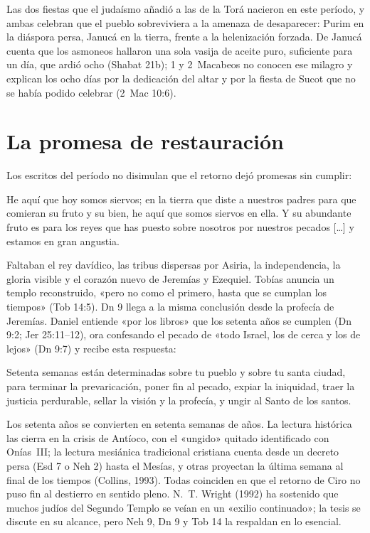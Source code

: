 Las dos fiestas que el judaísmo añadió a las de la Torá nacieron en este período, y ambas celebran que el pueblo sobreviviera a la amenaza de desaparecer: Purim en la diáspora persa, Janucá en la tierra, frente a la helenización forzada. De Janucá cuenta que los asmoneos hallaron una sola vasija de aceite puro, suficiente para un día, que ardió ocho (Shabat 21b); 1 y 2~Macabeos no conocen ese milagro y explican los ocho días por la dedicación del altar y por la fiesta de Sucot que no se había podido celebrar (2~Mac 10:6).

\section{La promesa de restauración}

Los escritos del período no disimulan que el retorno dejó promesas sin cumplir:
\begin{cita}He aquí que hoy somos siervos; en la tierra que diste a nuestros padres para que comieran su fruto y su bien, he aquí que somos siervos en ella. Y su abundante fruto es para los reyes que has puesto sobre nosotros por nuestros pecados [\ldots] y estamos en gran angustia.\end{cita}
Faltaban el rey davídico, las tribus dispersas por Asiria, la independencia, la gloria visible y el corazón nuevo de Jeremías y Ezequiel. Tobías anuncia un templo reconstruido, «pero no como el primero, hasta que se cumplan los tiempos» (Tob 14:5). Dn 9 llega a la misma conclusión desde la profecía de Jeremías. Daniel entiende «por los libros» que los setenta años se cumplen (Dn 9:2; Jer 25:11--12), ora confesando el pecado de «todo Israel, los de cerca y los de lejos» (Dn 9:7) y recibe esta respuesta:
\begin{cita}Setenta semanas están determinadas sobre tu pueblo y sobre tu santa ciudad, para terminar la prevaricación, poner fin al pecado, expiar la iniquidad, traer la justicia perdurable, sellar la visión y la profecía, y ungir al Santo de los santos.\end{cita}
Los setenta años se convierten en setenta semanas de años. La lectura histórica las cierra en la crisis de Antíoco, con el «ungido» quitado identificado con Onías~III; la lectura mesiánica tradicional cristiana cuenta desde un decreto persa (Esd 7 o Neh 2) hasta el Mesías, y otras proyectan la última semana al final de los tiempos (Collins, 1993). Todas coinciden en que el retorno de Ciro no puso fin al destierro en sentido pleno. N.~T. Wright (1992) ha sostenido que muchos judíos del Segundo Templo se veían en un «exilio continuado»; la tesis se discute en su alcance, pero Neh 9, Dn 9 y Tob 14 la respaldan en lo esencial.

